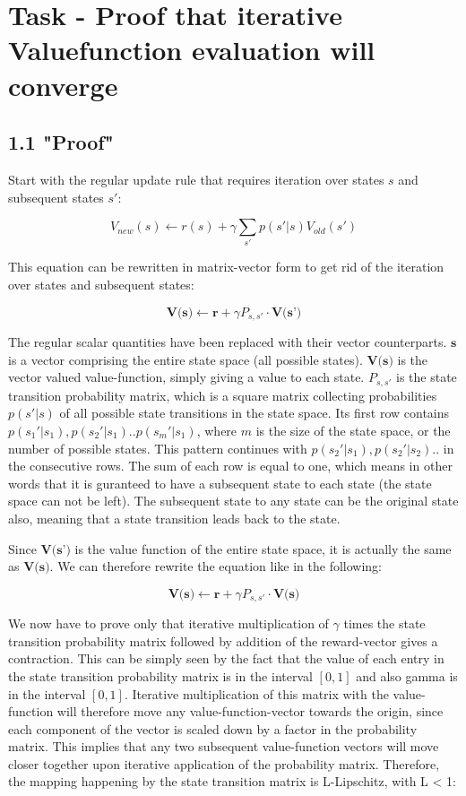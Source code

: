 
\section{Task - Proof that iterative Valuefunction evaluation will converge}



\subsection*{1.1 "Proof"}
 Start with the regular update rule that requires iteration over states $s$ and subsequent states $s'$: 


$$
V_{new} (s) \leftarrow r(s) + \gamma \sum_{s'} p(s' \vert s) V_{old}(s')
$$



This equation can be rewritten in matrix-vector form to get rid of the iteration over states and subsequent states:

$$
\textbf{V(s)} \leftarrow \textbf{r} + \gamma P_{s,s'} \cdot \textbf{V(s')}
$$



The regular scalar quantities have been replaced with their vector counterparts. $\textbf{s}$ is a vector comprising the entire state space (all possible states). $\textbf{V(s)}$ is the vector valued value-function, simply giving a value to each state. $P_{s,s'}$ is the state transition probability matrix, which is a square matrix collecting probabilities $p(s' \vert s)$ of all possible state transitions in the state space. Its first row contains $p(s_1' \vert s_1), p(s_2' \vert s_1) .. p(s_m' \vert s_1)$, where $m$ is the size of the state space, or the number of possible states.  This pattern continues with $p(s_2' \vert s_1), p(s_2' \vert s_2) ..$ in the consecutive rows. The sum of each row is equal to one, which means in other words that it is guranteed to have a subsequent state to each state (the state space can not be left). The subsequent state to any state can be the original state also, meaning that a state transition leads back to the state.


Since $\textbf{V(s')}$ is the value function of the entire state space, it is actually the same as $\textbf{V(s)}$. We can therefore rewrite the equation like in the following:


$$
\textbf{V(s)} \leftarrow \textbf{r} + \gamma P_{s,s'} \cdot \textbf{V(s)}
$$

We now have to prove only that iterative multiplication of $\gamma$ times the state transition probability matrix followed by addition of the reward-vector gives a contraction. This can be simply seen by the fact that the value of each entry in the state transition probability matrix is in the interval $[0, 1]$ and also gamma is in the interval $[0, 1]$. Iterative multiplication of this matrix with the value-function will therefore move any value-function-vector towards the origin, since each component of the vector is scaled down by a factor in the probability matrix. This implies that any two subsequent value-function vectors will move closer together upon iterative application of the probability matrix. Therefore, the mapping happening by the state transition matrix is L-Lipschitz, with L < 1: 

